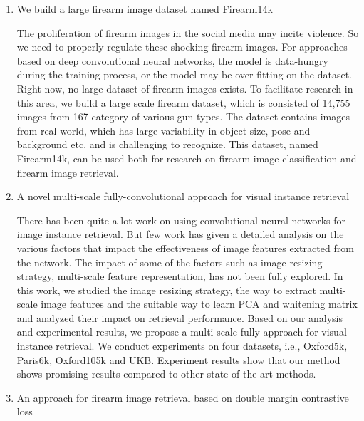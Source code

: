 \begin{enumerate}
	\item We build a large firearm image dataset named Firearm14k

The proliferation of firearm images in the social media may incite violence. So we need to properly regulate these shocking firearm images. For approaches based on deep convolutional neural networks, the model is data-hungry during the training process, or the model may be over-fitting on the dataset. Right now, no large dataset of firearm images exists. To facilitate research in this area, we build a large scale firearm dataset, which is consisted of 14,755 images from 167 category of various gun types. The dataset contains images from real world, which has large variability in object size, pose and background etc. and is challenging to recognize. This dataset, named Firearm14k, can be used both for research on firearm image classification and firearm image retrieval.

\item A novel multi-scale fully-convolutional approach for visual instance retrieval

There has been quite a lot work on using convolutional neural networks for image instance retrieval. But few work has given a detailed analysis on the various factors that impact the effectiveness of image features extracted from the network. The impact of some of the factors such as image resizing strategy, multi-scale feature representation, has not been fully explored. In this work, we studied the image resizing strategy, the way to extract multi-scale image features and the suitable way to learn PCA and whitening matrix and analyzed their impact on retrieval performance. Based on our analysis and experimental results, we propose a multi-scale fully approach for visual instance retrieval. We conduct experiments on four datasets, i.e., Oxford5k, Paris6k, Oxford105k and UKB. Experiment results show that our method shows promising results compared to other state-of-the-art methods.

\item An approach for firearm image retrieval based on double margin contrastive loss


\end{enumerate}
